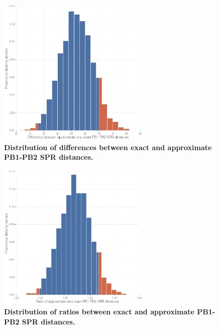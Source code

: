 \documentclass[11pt,oneside,letterpaper]{article}
\begin{document}
\clearpage

\begin{figure}
\centering  
\includegraphics[width=0.65\textwidth]  {supp_figures/InfB_supp_PB1-PB2_hist.png}
\caption{\textbf{Distribution of differences between exact and approximate PB1-PB2 SPR distances.}}
\label{SPR_PB1-PB2_difference}
\end{figure}

\begin{figure}
\centering  
\includegraphics[width=0.65\textwidth]  {supp_figures/InfB_supp_PB1-PB2_hist2.png}
\caption{\textbf{Distribution of ratios between exact and approximate PB1-PB2 SPR distances.}}
\label{SPR_PB1-PB2_ratio}
\end{figure}
\end{document}
